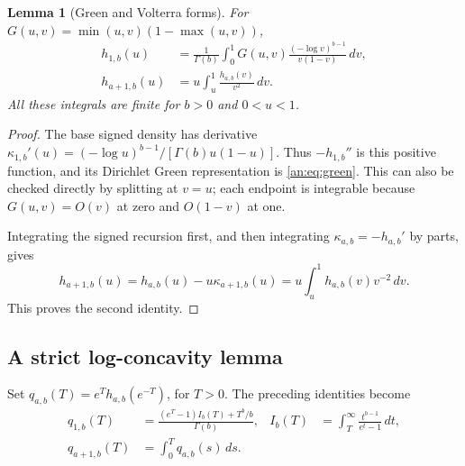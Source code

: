 \documentclass[11pt]{article}
\numberwithin{equation}{section}
\theoremstyle{plain}
\newtheorem{lemma}[theorem]{Lemma}
\theoremstyle{definition}
\theoremstyle{remark}
\begin{document}
\begin{lemma}[Green and Volterra forms]\label{an:lem:green}
For $G(u,v)=\min(u,v)(1-\max(u,v))$,
\begin{align}
 h_{1,b}(u)&=\frac1{\Gamma(b)}\int_0^1
      G(u,v)\frac{(-\log v)^{b-1}}{v(1-v)}\,dv,\label{an:eq:green}\\
 h_{a+1,b}(u)&=u\int_u^1\frac{h_{a,b}(v)}{v^2}\,dv.\label{an:eq:volterra}
\end{align}
All these integrals are finite for $b>0$ and $0<u<1$.
\end{lemma}
\begin{proof}
The base signed density has derivative
$\kappa_{1,b}'(u)=(-\log u)^{b-1}/[\Gamma(b)u(1-u)]$.
Thus $-h_{1,b}''$ is this positive function, and its Dirichlet Green
representation is \eqref{an:eq:green}. This can also be checked
directly by splitting at $v=u$; each endpoint is integrable because
$G(u,v)=O(v)$ at zero and $O(1-v)$ at one.

Integrating the signed recursion first, and then integrating
$\kappa_{a,b}=-h_{a,b}'$ by parts, gives
\[
 h_{a+1,b}(u)=h_{a,b}(u)-u\kappa_{a+1,b}(u)
 =u\int_u^1 h_{a,b}(v)v^{-2}\,dv.
\]
This proves the second identity.
\end{proof}

\subsection{A strict log-concavity lemma}

Set $q_{a,b}(T)=e^T h_{a,b}(e^{-T})$, for $T>0$. The preceding
identities become
\begin{align}
 q_{1,b}(T)&=\frac{(e^T-1)I_b(T)+T^b/b}{\Gamma(b)},
 &I_b(T)&=\int_T^\infty\frac{t^{b-1}}{e^t-1}\,dt,\label{an:eq:gbase}\\
 q_{a+1,b}(T)&=\int_0^Tq_{a,b}(s)\,ds.\label{an:eq:gintegral}
\end{align}
\end{document}
